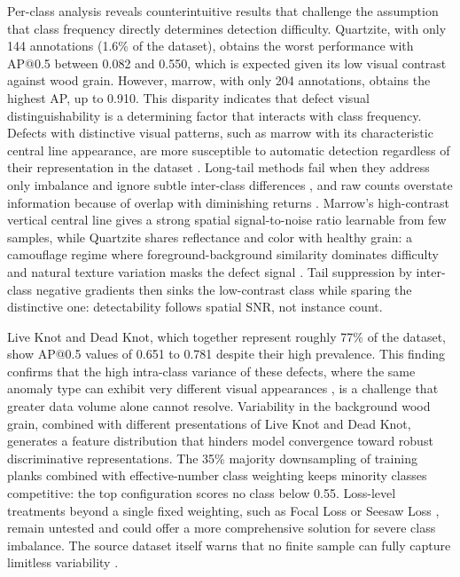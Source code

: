 \documentclass[pdflatex,sn-basic,Numbered,iicol]{sn-jnl}
\begin{document}
Per-class analysis reveals counterintuitive results that challenge the assumption that class frequency directly determines detection difficulty. Quartzite, with only 144 annotations (1.6\% of the dataset), obtains the worst performance with AP@0.5 between 0.082 and 0.550, which is expected given its low visual contrast against wood grain. However, marrow, with only 204 annotations, obtains the highest AP, up to 0.910. This disparity indicates that defect visual distinguishability is a determining factor that interacts with class frequency. Defects with distinctive visual patterns, such as marrow with its characteristic central line appearance, are more susceptible to automatic detection regardless of their representation in the dataset \citep{Chen2023Recognition}. Long-tail methods fail when they address only imbalance and ignore subtle inter-class differences \citep{zhang2021deep}, and raw counts overstate information because of overlap with diminishing returns \citep{cui2019classbalanced}. Marrow's high-contrast vertical central line gives a strong spatial signal-to-noise ratio learnable from few samples, while Quartzite shares reflectance and color with healthy grain: a camouflage regime where foreground-background similarity dominates difficulty \citep{fan2020cod} and natural texture variation masks the defect signal \citep{Chen2023Recognition}. Tail suppression by inter-class negative gradients \citep{tan2020equalization} then sinks the low-contrast class while sparing the distinctive one: detectability follows spatial SNR, not instance count.

Live Knot and Dead Knot, which together represent roughly 77\% of the dataset, show AP@0.5 values of 0.651 to 0.781 despite their high prevalence. This finding confirms that the high intra-class variance of these defects, where the same anomaly type can exhibit very different visual appearances \citep{Kodytek2022Dataset}, is a challenge that greater data volume alone cannot resolve. Variability in the background wood grain, combined with different presentations of Live Knot and Dead Knot, generates a feature distribution that hinders model convergence toward robust discriminative representations. The 35\% majority downsampling of training planks combined with effective-number class weighting \citep{cui2019classbalanced} keeps minority classes competitive: the top configuration scores no class below 0.55. Loss-level treatments beyond a single fixed weighting, such as Focal Loss \citep{lin2017focal} or Seesaw Loss \citep{wang2021seesaw}, remain untested and could offer a more comprehensive solution for severe class imbalance. The source dataset itself warns that no finite sample can fully capture limitless variability \citep{Kodytek2022Dataset}.
\end{document}
